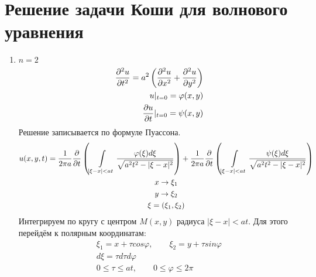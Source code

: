 \documentclass[../main.tex]{subfiles}
\begin{document}
\section{Решение задачи Коши для волнового уравнения}
\begin{enumerate}
    \item $n=2$
\begin{equation}
    \label{eq:2.7.1}
    \begin{split}
    \frac{\partial ^2u}{\partial t^2} = a^2\left(\frac{\partial ^2u}{\partial x^2}+\frac{\partial ^2u}{\partial y^2}\right)\\
    u|_{t=0} = \varphi(x,y)\\
    \frac{\partial u}{\partial t}|_{t=0} = \psi(x,y)
    \end{split}
\end{equation}
Решение записывается по формуле Пуассона.
\begin{gather*}
    u(x,y,t) = \frac{1}{2\pi a}\frac{\partial  }{\partial t}\left(
    \int\displaylimits_{|\xi-x|<at} \frac{\varphi(\xi)d\xi}{\sqrt{a^2t^2 - |\xi-x|^2}}\right)
    +
    \frac{1}{2\pi a}\frac{\partial  }{\partial t}\left(
    \int\displaylimits_{|\xi-x|<at} \frac{\psi(\xi)d\xi}{\sqrt{a^2t^2 - |\xi-x|^2}}\right)\\
    x \rightarrow \xi_1\\
    y \rightarrow \xi_2\\
    \xi = (\xi_1,\xi_2)
\end{gather*}
Интегрируем по кругу с центром $M(x,y)$ радиуса $|\xi-x|<at$. Для этого перейдём к
полярным координатам:
\begin{gather*}
    \xi_1 = x + \tau cos\varphi, \qquad \xi_2 = y + \tau sin\varphi\\
    d\xi = \tau d\tau d\varphi \\
    0 \leq \tau \leq at, \qquad 0 \leq \varphi \leq 2\pi
\end{gather*}


\end{enumerate}
\end{document}
